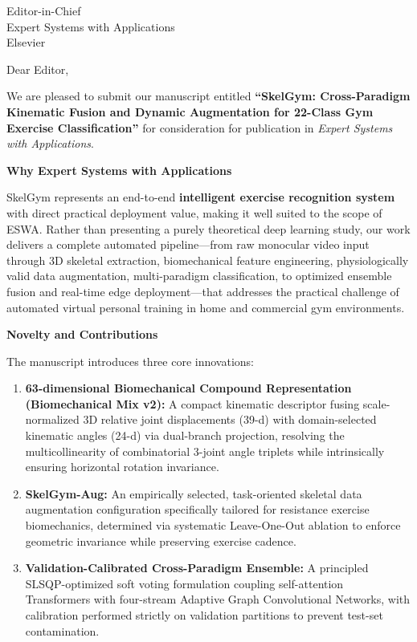\documentclass[11pt]{letter}
\date{\today}
\begin{document}
\begin{letter}{Editor-in-Chief\\Expert Systems with Applications\\Elsevier}

\opening{Dear Editor,}

We are pleased to submit our manuscript entitled \textbf{``SkelGym: Cross-Paradigm Kinematic Fusion and Dynamic Augmentation for 22-Class Gym Exercise Classification''} for consideration for publication in \textit{Expert Systems with Applications}.

\noindent\textbf{Why Expert Systems with Applications}

SkelGym represents an end-to-end \textbf{intelligent exercise recognition system} with direct practical deployment value, making it well suited to the scope of ESWA. Rather than presenting a purely theoretical deep learning study, our work delivers a complete automated pipeline---from raw monocular video input through 3D skeletal extraction, biomechanical feature engineering, physiologically valid data augmentation, multi-paradigm classification, to optimized ensemble fusion and real-time edge deployment---that addresses the practical challenge of automated virtual personal training in home and commercial gym environments.

\noindent\textbf{Novelty and Contributions}

The manuscript introduces three core innovations:
\begin{enumerate}
    \item \textbf{63-dimensional Biomechanical Compound Representation (Biomechanical Mix v2):} A compact kinematic descriptor fusing scale-normalized 3D relative joint displacements (39-d) with domain-selected kinematic angles (24-d) via dual-branch projection, resolving the multicollinearity of combinatorial 3-joint angle triplets while intrinsically ensuring horizontal rotation invariance.

    \item \textbf{SkelGym-Aug:} An empirically selected, task-oriented skeletal data augmentation configuration specifically tailored for resistance exercise biomechanics, determined via systematic Leave-One-Out ablation to enforce geometric invariance while preserving exercise cadence.

    \item \textbf{Validation-Calibrated Cross-Paradigm Ensemble:} A principled SLSQP-optimized soft voting formulation coupling self-attention Transformers with four-stream Adaptive Graph Convolutional Networks, with calibration performed strictly on validation partitions to prevent test-set contamination.
\end{enumerate}


\end{letter}
\end{document}
